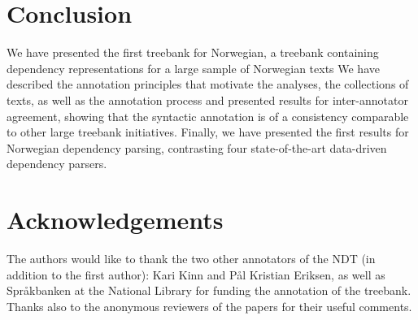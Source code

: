 \documentclass[10pt,a4paper]{article}
\begin{document}
\section{Conclusion}
We have presented the first treebank for Norwegian, a treebank
containing dependency representations for a large sample of Norwegian
texts
We have described the
annotation principles that motivate the analyses, the collections of
texts, as well as the annotation process and presented results for
inter-annotator agreement, showing that the syntactic annotation is of
a consistency comparable to other large treebank initiatives. Finally,
we have presented the first results for Norwegian dependency parsing,
contrasting four state-of-the-art data-driven dependency parsers.

\section{Acknowledgements}

The authors would like to thank the two other annotators of the NDT (in addition to the first author): Kari Kinn and Pål Kristian Eriksen, as well as Spr{\aa}kbanken at the National Library for funding the annotation of the treebank. Thanks also to the anonymous reviewers of the papers for their useful comments.





\end{document}
